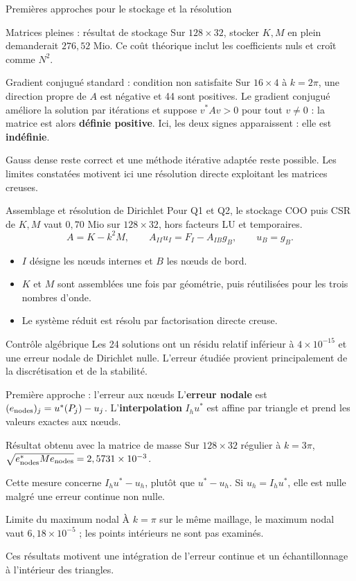 \documentclass[12pt,aspectratio=169,t]{beamer}
\begin{document}
\begin{frame}{Premières approches pour le stockage et la résolution}
\begin{block}{Matrices pleines : résultat de stockage}
Sur $128\times32$, stocker $K,M$ en plein demanderait $276,52$ Mio. Ce coût théorique inclut les coefficients nuls et croît comme $N^2$.
\end{block}
\begin{block}{Gradient conjugué standard : condition non satisfaite}
Sur $16\times4$ à $k=2\pi$, une direction propre de $A$ est négative et 44 sont positives. Le gradient conjugué améliore la solution par itérations et suppose $v^*Av>0$ pour tout $v\neq0$ : la matrice est alors \textbf{définie positive}. Ici, les deux signes apparaissent : elle est \textbf{indéfinie}.
\end{block}
Gauss dense reste correct et une méthode itérative adaptée reste possible. Les limites constatées motivent ici une résolution directe exploitant les matrices creuses.
\end{frame}

\begin{frame}{Assemblage et résolution de Dirichlet}
Pour Q1 et Q2, le stockage COO puis CSR de $K,M$ vaut $0,70$ Mio sur $128\times32$, hors facteurs LU et temporaires.
\[
A=K-k^2M,\qquad A_{II}u_I=F_I-A_{IB}g_B,\qquad u_B=g_B.
\]
\begin{itemize}
\item $I$ désigne les nœuds internes et $B$ les nœuds de bord.
\item $K$ et $M$ sont assemblées une fois par géométrie, puis réutilisées pour les trois nombres d'onde.
\item Le système réduit est résolu par factorisation directe creuse.
\end{itemize}
\begin{block}{Contrôle algébrique}
Les 24 solutions ont un résidu relatif inférieur à $4\times10^{-15}$ et une erreur nodale de Dirichlet nulle. L'erreur étudiée provient principalement de la discrétisation et de la stabilité.
\end{block}
\end{frame}


\begin{frame}{Première approche : l'erreur aux nœuds}
L’\textbf{erreur nodale} est $(e_{\rm nodes})_j=u^*(P_j)-u_j$. L’\textbf{interpolation} $I_hu^*$ est affine par triangle et prend les valeurs exactes aux nœuds.
\begin{block}{Résultat obtenu avec la matrice de masse}
Sur $128\times32$ régulier à $k=3\pi$, $\sqrt{e_{\rm nodes}^*Me_{\rm nodes}}=2,5731\times10^{-3}$.
\end{block}
Cette mesure concerne $I_hu^*-u_h$, plutôt que $u^*-u_h$. Si $u_h=I_hu^*$, elle est nulle malgré une erreur continue non nulle.
\begin{block}{Limite du maximum nodal}
À $k=\pi$ sur le même maillage, le maximum nodal vaut $6,18\times10^{-5}$ ; les points intérieurs ne sont pas examinés.
\end{block}
Ces résultats motivent une intégration de l'erreur continue et un échantillonnage à l'intérieur des triangles.
\end{frame}
\end{document}
